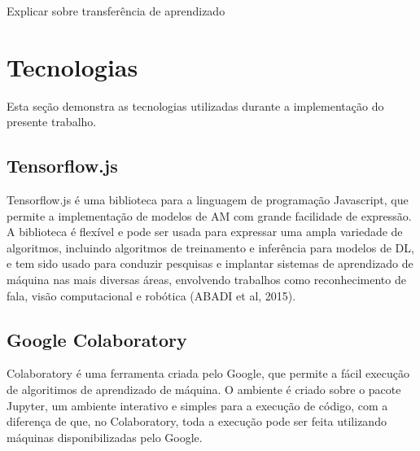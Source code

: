 \par Explicar sobre transferência de aprendizado

\section{Tecnologias}

Esta seção demonstra as tecnologias utilizadas durante a implementação do presente trabalho.

\subsection{Tensorflow.js}

Tensorflow.js é uma biblioteca para a linguagem de programação Javascript, que permite a implementação de modelos de AM com grande facilidade de expressão. A biblioteca é flexível e pode ser usada para expressar uma ampla variedade de algoritmos, incluindo algoritmos de treinamento e inferência para modelos de DL, e tem sido usado para conduzir pesquisas e implantar sistemas de aprendizado de máquina nas mais diversas áreas, envolvendo trabalhos como reconhecimento de fala, visão computacional e robótica (ABADI et al, 2015). 

\subsection{Google Colaboratory}

Colaboratory é uma ferramenta criada pelo Google, que permite a fácil execução de algoritimos de aprendizado de máquina. O ambiente é criado sobre o pacote Jupyter, um ambiente interativo e simples para a execução de código, com a diferença de que, no Colaboratory, toda a execução pode ser feita utilizando máquinas disponibilizadas pelo Google.
